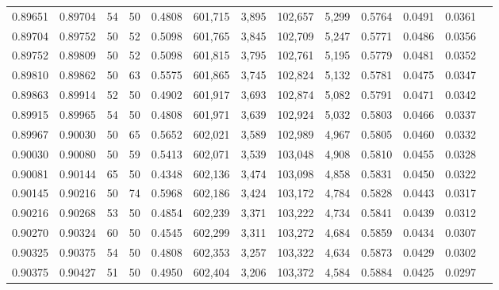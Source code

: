 \begin{tabular}{rrrrrrrrrrrrr}
0.89651 & 0.89704 &    54 &  50 &                                     0.4808 & 601,715 &   3,895 & 102,657 &   5,299 & 0.5764 & 0.0491 & 0.0361 \\
0.89704 & 0.89752 &    50 &  52 &                                     0.5098 & 601,765 &   3,845 & 102,709 &   5,247 & 0.5771 & 0.0486 & 0.0356 \\
0.89752 & 0.89809 &    50 &  52 &                                     0.5098 & 601,815 &   3,795 & 102,761 &   5,195 & 0.5779 & 0.0481 & 0.0352 \\
0.89810 & 0.89862 &    50 &  63 &                                     0.5575 & 601,865 &   3,745 & 102,824 &   5,132 & 0.5781 & 0.0475 & 0.0347 \\
0.89863 & 0.89914 &    52 &  50 &                                     0.4902 & 601,917 &   3,693 & 102,874 &   5,082 & 0.5791 & 0.0471 & 0.0342 \\
0.89915 & 0.89965 &    54 &  50 &                                     0.4808 & 601,971 &   3,639 & 102,924 &   5,032 & 0.5803 & 0.0466 & 0.0337 \\
0.89967 & 0.90030 &    50 &  65 &                                     0.5652 & 602,021 &   3,589 & 102,989 &   4,967 & 0.5805 & 0.0460 & 0.0332 \\
0.90030 & 0.90080 &    50 &  59 &                                     0.5413 & 602,071 &   3,539 & 103,048 &   4,908 & 0.5810 & 0.0455 & 0.0328 \\
0.90081 & 0.90144 &    65 &  50 &                                     0.4348 & 602,136 &   3,474 & 103,098 &   4,858 & 0.5831 & 0.0450 & 0.0322 \\
0.90145 & 0.90216 &    50 &  74 &                                     0.5968 & 602,186 &   3,424 & 103,172 &   4,784 & 0.5828 & 0.0443 & 0.0317 \\
0.90216 & 0.90268 &    53 &  50 &                                     0.4854 & 602,239 &   3,371 & 103,222 &   4,734 & 0.5841 & 0.0439 & 0.0312 \\
0.90270 & 0.90324 &    60 &  50 &                                     0.4545 & 602,299 &   3,311 & 103,272 &   4,684 & 0.5859 & 0.0434 & 0.0307 \\
0.90325 & 0.90375 &    54 &  50 &                                     0.4808 & 602,353 &   3,257 & 103,322 &   4,634 & 0.5873 & 0.0429 & 0.0302 \\
0.90375 & 0.90427 &    51 &  50 &                                     0.4950 & 602,404 &   3,206 & 103,372 &   4,584 & 0.5884 & 0.0425 & 0.0297 \\

\end{tabular}
